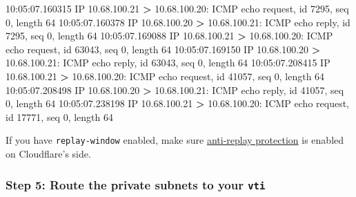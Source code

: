 \documentclass[
]{article}
\newenvironment{Shaded}{\begin{snugshade}}{\end{snugshade}}
\newcommand{\ExtensionTok}[1]{#1}
\newcommand{\NormalTok}[1]{#1}
\newcommand{\OperatorTok}[1]{\textcolor[rgb]{0.81,0.36,0.00}{\textbf{#1}}}
\begin{document}
\begin{Shaded}
\begin{Highlighting}[numbers=left,,]
\ExtensionTok{10:05:07.160315}\NormalTok{ IP 10.68.100.21 }\OperatorTok{\textgreater{}}\NormalTok{ 10.68.100.20: ICMP echo request, id 7295, seq 0, length 64}
\ExtensionTok{10:05:07.160378}\NormalTok{ IP 10.68.100.20 }\OperatorTok{\textgreater{}}\NormalTok{ 10.68.100.21: ICMP echo reply, id 7295, seq 0, length 64}
\ExtensionTok{10:05:07.169088}\NormalTok{ IP 10.68.100.21 }\OperatorTok{\textgreater{}}\NormalTok{ 10.68.100.20: ICMP echo request, id 63043, seq 0, length 64}
\ExtensionTok{10:05:07.169150}\NormalTok{ IP 10.68.100.20 }\OperatorTok{\textgreater{}}\NormalTok{ 10.68.100.21: ICMP echo reply, id 63043, seq 0, length 64}
\ExtensionTok{10:05:07.208415}\NormalTok{ IP 10.68.100.21 }\OperatorTok{\textgreater{}}\NormalTok{ 10.68.100.20: ICMP echo request, id 41057, seq 0, length 64}
\ExtensionTok{10:05:07.208498}\NormalTok{ IP 10.68.100.20 }\OperatorTok{\textgreater{}}\NormalTok{ 10.68.100.21: ICMP echo reply, id 41057, seq 0, length 64}
\ExtensionTok{10:05:07.238198}\NormalTok{ IP 10.68.100.21 }\OperatorTok{\textgreater{}}\NormalTok{ 10.68.100.20: ICMP echo request, id 17771, seq 0, length 64}
\end{Highlighting}
\end{Shaded}

If you have \texttt{replay-window} enabled, make sure
\href{https://developers.cloudflare.com/magic-wan/reference/anti-replay-protection/}{anti-replay
protection} is enabled on Cloudflare's side.

\newpage{}

\subsubsection{\texorpdfstring{Step 5: Route the private subnets to your
\texttt{vti}}{Step 5: Route the private subnets to your vti}}\label{step-5-route-the-private-subnets-to-your-vti}
\end{document}
